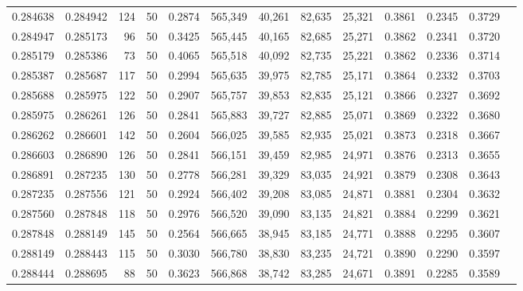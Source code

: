 \begin{tabular}{rrrrrrrrrrrrr}
0.284638 & 0.284942 &   124 &  50 &                                     0.2874 & 565,349 &  40,261 &  82,635 &  25,321 & 0.3861 & 0.2345 & 0.3729 \\
0.284947 & 0.285173 &    96 &  50 &                                     0.3425 & 565,445 &  40,165 &  82,685 &  25,271 & 0.3862 & 0.2341 & 0.3720 \\
0.285179 & 0.285386 &    73 &  50 &                                     0.4065 & 565,518 &  40,092 &  82,735 &  25,221 & 0.3862 & 0.2336 & 0.3714 \\
0.285387 & 0.285687 &   117 &  50 &                                     0.2994 & 565,635 &  39,975 &  82,785 &  25,171 & 0.3864 & 0.2332 & 0.3703 \\
0.285688 & 0.285975 &   122 &  50 &                                     0.2907 & 565,757 &  39,853 &  82,835 &  25,121 & 0.3866 & 0.2327 & 0.3692 \\
0.285975 & 0.286261 &   126 &  50 &                                     0.2841 & 565,883 &  39,727 &  82,885 &  25,071 & 0.3869 & 0.2322 & 0.3680 \\
0.286262 & 0.286601 &   142 &  50 &                                     0.2604 & 566,025 &  39,585 &  82,935 &  25,021 & 0.3873 & 0.2318 & 0.3667 \\
0.286603 & 0.286890 &   126 &  50 &                                     0.2841 & 566,151 &  39,459 &  82,985 &  24,971 & 0.3876 & 0.2313 & 0.3655 \\
0.286891 & 0.287235 &   130 &  50 &                                     0.2778 & 566,281 &  39,329 &  83,035 &  24,921 & 0.3879 & 0.2308 & 0.3643 \\
0.287235 & 0.287556 &   121 &  50 &                                     0.2924 & 566,402 &  39,208 &  83,085 &  24,871 & 0.3881 & 0.2304 & 0.3632 \\
0.287560 & 0.287848 &   118 &  50 &                                     0.2976 & 566,520 &  39,090 &  83,135 &  24,821 & 0.3884 & 0.2299 & 0.3621 \\
0.287848 & 0.288149 &   145 &  50 &                                     0.2564 & 566,665 &  38,945 &  83,185 &  24,771 & 0.3888 & 0.2295 & 0.3607 \\
0.288149 & 0.288443 &   115 &  50 &                                     0.3030 & 566,780 &  38,830 &  83,235 &  24,721 & 0.3890 & 0.2290 & 0.3597 \\
0.288444 & 0.288695 &    88 &  50 &                                     0.3623 & 566,868 &  38,742 &  83,285 &  24,671 & 0.3891 & 0.2285 & 0.3589 \\

\end{tabular}
